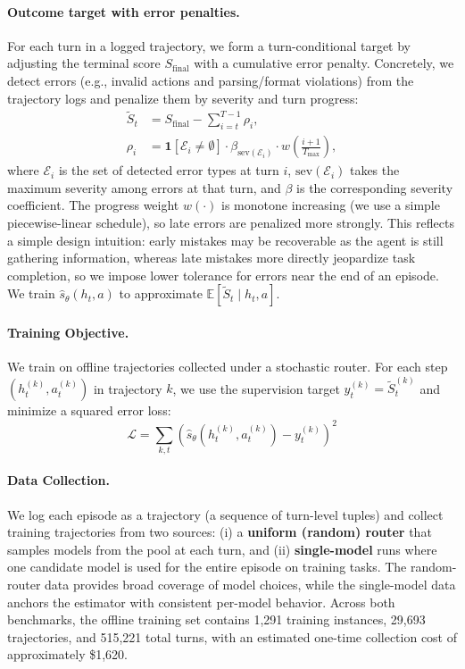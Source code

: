 \paragraph{Outcome target with error penalties.}
For each turn in a logged trajectory, we form a turn-conditional target by adjusting the terminal score $S_{\text{final}}$ with a cumulative error penalty.
Concretely, we detect errors (e.g., invalid actions and parsing/format violations) from the trajectory logs and penalize them by severity and turn progress:
\begin{align}
    \label{eq:error}
\tilde{S}_t &= S_{\text{final}} - \sum_{i=t}^{T-1} \rho_i, \\
\rho_i &= \mathbf{1}[\mathcal{E}_i\neq\emptyset]\cdot \beta_{\mathrm{sev}(\mathcal{E}_i)}\cdot w\!\left(\tfrac{i+1}{T_{\max}}\right),
\end{align}
where $\mathcal{E}_i$ is the set of detected error types at turn $i$, $\mathrm{sev}(\mathcal{E}_i)$ takes the maximum severity among errors at that turn, and $\beta$ is the corresponding severity coefficient.
The progress weight $w(\cdot)$ is monotone increasing (we use a simple piecewise-linear schedule), so late errors are penalized more strongly.
This reflects a simple design intuition: early mistakes may be  recoverable as the agent is still gathering information, whereas late mistakes more directly jeopardize task completion, so we impose lower tolerance for errors near the end of an episode.
We train $\hat{s}_\theta(h_t,a)$ to approximate $\mathbb{E}[\tilde{S}_t \mid h_t,a]$.

\paragraph{Training Objective.}
We train on offline trajectories collected under a stochastic router. For each step $(h_t^{(k)}, a_t^{(k)})$ in trajectory $k$, we use the supervision target $y^{(k)}_t=\tilde{S}^{(k)}_t$ and minimize a squared error loss:
\begin{equation}
\mathcal{L} = \sum_{k,t} \left( \hat{s}_\theta(h_t^{(k)}, a_t^{(k)}) - y^{(k)}_t \right)^2
\end{equation}

\paragraph{Data Collection.}
We log each episode as a trajectory (a sequence of turn-level tuples) and collect training trajectories from two sources:
(i) a \textbf{uniform (random) router} that samples models from the pool at each turn, and
(ii) \textbf{single-model} runs where one candidate model is used for the entire episode on training tasks.
The random-router data provides broad coverage of model choices, while the single-model data anchors the estimator with consistent per-model behavior.
Across both benchmarks, the offline training set contains 1,291 training instances, 29,693 trajectories, and 515,221 total turns, with an estimated one-time collection cost of approximately \$1,620.

